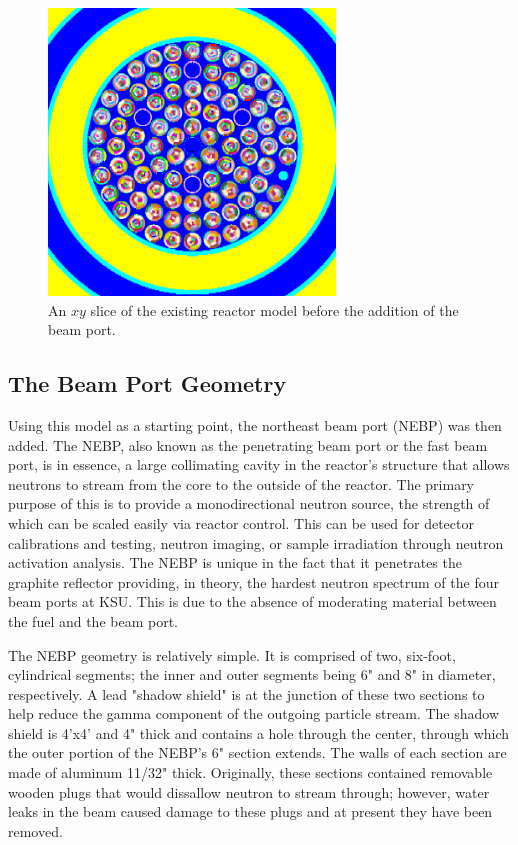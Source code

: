 \begin{figure}[htb]
\centering
\includegraphics[height=3in]{tex/figures/existingxy.png}
\caption[Old Reactor Model $XY$]{An $xy$ slice of the existing reactor model before the addition of the beam port.}
\label{fig:existingxy}
\end{figure}


\subsection{The Beam Port Geometry}

Using this model as a starting point, the northeast beam port (NEBP) was then added.
The NEBP, also known as the penetrating beam port or the fast beam port, is in essence, a large collimating cavity in the reactor's structure that allows neutrons to stream from the core to the outside of the reactor.
The primary purpose of this is to provide a monodirectional neutron source, the strength of which can be scaled easily via reactor control.
This can be used for detector calibrations and testing, neutron imaging, or sample irradiation through neutron activation analysis.
The NEBP is unique in the fact that it penetrates the graphite reflector providing, in theory, the hardest neutron spectrum of the four beam ports at KSU.
This is due to the absence of moderating material between the fuel and the beam port.

The NEBP geometry is relatively simple.
It is comprised of two, six-foot, cylindrical segments; the inner and outer segments being 6" and 8" in diameter, respectively.
A lead "shadow shield" is at the junction of these two sections to help reduce the gamma component of the outgoing particle stream.
The shadow shield is 4'x4' and 4" thick and contains a hole through the center, through which the outer portion of the NEBP's 6" section extends.
The walls of each section are made of aluminum 11/32" thick.
Originally, these sections contained removable wooden plugs that would dissallow neutron to stream through; however, water leaks in the beam caused damage to these plugs and at present they have been removed.

